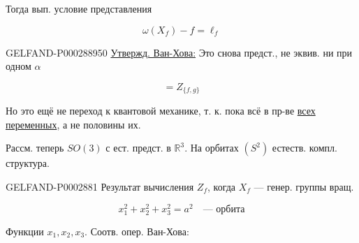 Тогда вып. условие представления

\begin{equation*}\omega(X_f)-f=\ell_f\end{equation*}

\begin{GelfandAdjacentEvidence}{GELFAND-P000288}{950}
\underline{Утвержд. Ван-Хова:} Это снова предст., не эквив. ни при одном $\alpha$

\begin{equation*}[Z_f,Z_g]=Z_{\{f,g\}}\end{equation*}\end{GelfandAdjacentEvidence}

Но это ещё не переход к квантовой механике, т. к. пока всё в пр-ве \underline{всех переменных}, а не половины их.

Рассм. теперь $SO(3)$ с ест. предст. в $\mathbb R^3$. На орбитах $(S^2)$ естеств. компл. структура.

\begin{GelfandAdjacentEvidence}{GELFAND-P000288}{1}
Результат вычисления $Z_f$, когда $X_f$ --- генер. группы вращ.





\end{GelfandAdjacentEvidence}


\begin{equation*}x_1^2+x_2^2+x_3^2=a^2\quad\text{--- орбита}\end{equation*}

Функции $x_1,x_2,x_3$. Соотв. опер. Ван-Хова:

\begin{center}\end{center}

